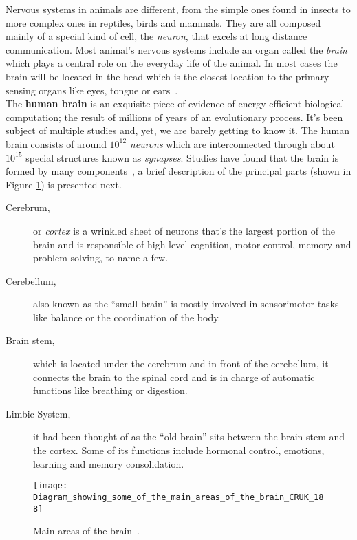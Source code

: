 Nervous systems in animals are different, from the simple ones found in insects to more complex ones in reptiles, birds and mammals. They are all composed mainly of a special kind of cell, the \emph{ neuron}, that excels at long distance communication. Most animal's nervous systems include an organ called the \emph{brain} which plays a central role on the everyday life of the animal. In most cases the brain will be located in the head which is the closest location to the primary sensing organs like eyes, tongue or ears~\cite{scholarpedia-brain}.\\


The \textbf{human brain} is an exquisite piece of evidence of energy-efficient biological computation; the result of millions of years of an evolutionary process. It's been subject of multiple studies and, yet, we are barely getting to know it. The human brain consists of around $10^{12}$ \emph{neurons} which are interconnected through about $10^{15}$ special structures known as \emph{synapses}.
Studies have found that the brain is formed by many components~\cite{thompson2000brain}, a brief description of the principal parts (shown in Figure \ref{fig:brain:components}) is presented next. 
\begin{description}
  \item[Cerebrum,] or \emph{cortex} is a wrinkled sheet of neurons that's the largest portion of the brain and is responsible of high level cognition, motor control, memory and problem solving, to name a few.
  \item[Cerebellum,] also known as the ``small brain'' is mostly involved in sensorimotor tasks like balance or the coordination of the body.
  \item[Brain stem,] which is located under the cerebrum and in front of the cerebellum, it connects the brain to the spinal cord and is in charge of automatic functions like breathing or digestion.
  \item[Limbic System,] it had been thought of as the ``old brain'' sits between the brain stem and the cortex. Some of its functions include hormonal control, emotions, learning and memory consolidation. 
\end{description}

\begin{figure}[hbt]
  \begin{center}
    \texttt{[image: Diagram\_showing\_some\_of\_the\_main\_areas\_of\_the\_brain\_CRUK\_188]}
    \caption{Main areas of the brain~\cite{wikipedia-images}.}
    \label{fig:brain:components}
  \end{center}
  
\end{figure}

